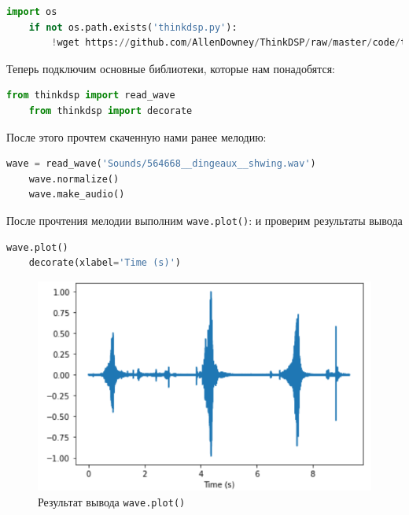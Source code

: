\documentclass[a4paper]{article}
\begin{document}
\begin{lstlisting}[language=Python, caption= Подключение \texttt{thinkdsp.py}]
    import os
    if not os.path.exists('thinkdsp.py'):
        !wget https://github.com/AllenDowney/ThinkDSP/raw/master/code/thinkdsp.py
\end{lstlisting}    
            
            Теперь подключим основные библиотеки, которые нам понадобятся:
            
\begin{lstlisting}[language=Python, caption= Подключение библиотек]
    from thinkdsp import read_wave
    from thinkdsp import decorate
\end{lstlisting}
        
            После этого прочтем скаченную нами ранее мелодию:
            
\begin{lstlisting}[language=Python, caption= Прочтение скаченной мелодии]
    wave = read_wave('Sounds/564668__dingeaux__shwing.wav')
    wave.normalize()
    wave.make_audio()
\end{lstlisting}
            
            После прочтения мелодии выполним \texttt{wave.plot()}: и проверим результаты вывода

\begin{lstlisting}[language=Python, caption= Просмотр \texttt{wave.plot()}]
    wave.plot()
    decorate(xlabel='Time (s)')
\end{lstlisting}

             \begin{figure}[H]
                \centering
                \includegraphics[width=\textwidth]{wave_plot.png}
                \caption{Результат вывода \texttt{wave.plot()}}
                \label{fig:result_output_1}
            \end{figure}
            
\end{document}
